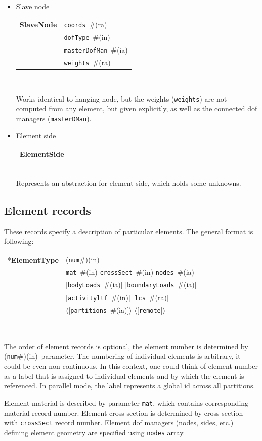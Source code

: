 \documentclass[a4paper]{article}
\makeatletter
\newcommand{\param}[1]{\texttt{#1}} %
\newcommand{\optional}[1]{[#1]} %
\newcommand{\field}[2]{\param{#1}~\#{\tiny(#2)}} %
\newcommand{\optField}[2]{\optional{\field{#1}{#2}}}
\newcommand{\optFieldnotype}[1]{[\param{#1}]}
\newcommand{\componentNum}{(\param{num}\#){\tiny(in)}} %
\newcommand{\entKeyword}[1]{*\textbf{#1}} %
\newcommand{\entKeywordInst}[1]{\textbf{#1}} %
\newcommand{\Pmode}[1]{{\sffamily #1}}
\renewcommand{\parallel}[1]{$\langle${#1}$\rangle$}
\newcommand{\PoptField      }[2]{\parallel{\optField{#1}{#2}}}
\newcommand{\PoptFieldnotype}[1]{\parallel{\optFieldnotype{#1}}}
\newenvironment{record}[1][]{\begin{tabular}{|ll}}{\end{tabular}\\}
\newcommand{\recentry}[2]{{#1}&{#2}\\}
\newcounter{rcc}
\newenvironment{record}[1][\textwidth]{\setcounter{rcc}{0}\begin{tabular*}{#1}{|ll@{\extracolsep{\fill}}r}}{\end{tabular*}\\}
\newcommand{\recentry}[2]{\ifthenelse{\value{rcc}>0}{&$\backslash$ \\}{\setcounter{rcc}{1}}{#1}&{#2}}
\makeatother
\begin{document}
\begin{itemize}
\item Slave node

\begin{record}[0.9\textwidth]
  \recentry{\entKeywordInst{SlaveNode}}{\field{coords}{ra}}
  \recentry{}{\field{dofType}{in}}
  \recentry{}{\field{masterDofMan}{ia}}
  \recentry{}{\field{weights}{ra}}
\end{record}

Works identical to hanging node, but the weights (\param{weights}) are not computed from any element,
but given explicitly, as well as the connected dof managers (\param{masterDMan}).

\item Element side

\begin{record}[0.9\textwidth]
  \recentry{\entKeywordInst{ElementSide}}{}
\end{record}
Represents an abstraction for element side, which holds some unknowns.
\end{itemize}

\subsection{Element records}
\label{_ElementsRecords}
These records specify a description of particular elements. The
general format is following:

\noindent
\begin{record}
  \recentry{\entKeyword{ElementType}}{\componentNum}
  \recentry{}{\field{mat}{in} \field{crossSect}{in} \field{nodes}{ia}}
  \recentry{}{\optField{bodyLoads}{ia} \optField{boundaryLoads}{ia}}
  \recentry{}{\optField{activityltf}{in} \optField{lcs}{ra}}
  \recentry{}{\PoptField{partitions}{ia} \PoptFieldnotype{remote}}
\end{record}

The order of element records is optional, the element number is determined by \componentNum\ parameter.
The numbering of individual elements is arbitrary, it could be even non-continuous. In this context, one could think of element number as a label that is assigned to individual elements and by which the element is referenced.
\Pmode{In parallel mode, the label represents a global id across all partitions.}

Element
material is described by parameter \param{mat}, which contains corresponding
material record number. Element cross
section is determined by cross section  with  \param{crossSect}
record number. Element dof managers (nodes, sides, etc.) defining element geometry are specified using
\param{nodes} array.
\end{document}
